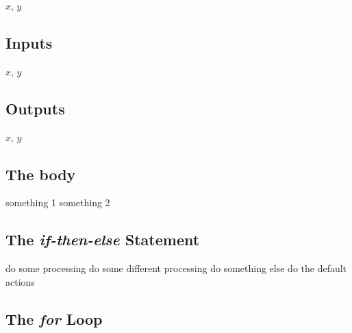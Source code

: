 \documentclass{amsart}
\begin{document}
\begin{algorithmic}[1]
    \GLOBALS $x$, $y$
\end{algorithmic}

\subsection{Inputs}

\begin{algorithmic}[1]
    \INPUTS[comment]
        \STATE $x$, $y$
    \ENDINPUTS
\end{algorithmic}

\subsection{Outputs}

\begin{algorithmic}[1]
    \OUTPUTS[comment]
        \STATE $x$, $y$
    \ENDOUTPUTS
\end{algorithmic}

\subsection{The body}

\begin{algorithmic}[1]
    \BODY[comment]
        \STATE something 1
        \STATE something 2
    \ENDBODY
\end{algorithmic}

\subsection{The \emph{if-then-else} Statement}


\begin{algorithmic}[1]
        \STATE do some processing
        \STATE do some different processing
        \STATE do something else
    \ELSE[comment]
        \STATE do the default actions
    \ENDIF
\end{algorithmic}

\subsection{The \emph{for} Loop}
\end{document}
